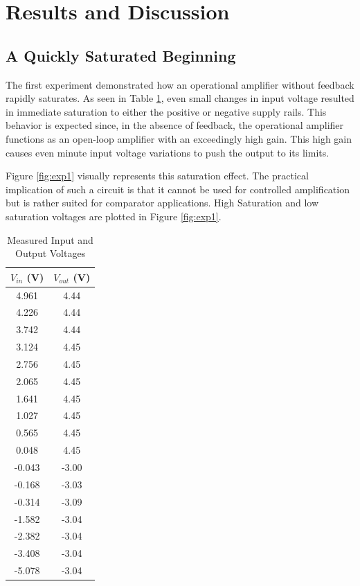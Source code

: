 \documentclass[12pt]{article}
\begin{document}
\section{Results and Discussion}
\subsection{A Quickly Saturated Beginning}

The first experiment demonstrated how an operational amplifier without feedback rapidly saturates. As seen in Table \ref{tab:measured_data}, even small changes in input voltage resulted in immediate saturation to either the positive or negative supply rails. This behavior is expected since, in the absence of feedback, the operational amplifier functions as an open-loop amplifier with an exceedingly high gain. This high gain causes even minute input voltage variations to push the output to its limits.

Figure \ref{fig:exp1} visually represents this saturation effect. The practical
implication of such a circuit is that it cannot be used for controlled
amplification but is rather suited for comparator applications. High Saturation
and low saturation voltages are plotted in Figure \ref{fig:exp1}.
\begin{table}[H]
	\centering
	\begin{tabular}{|c|c|}
		\hline
		$V_{in}$ (V) & $V_{out}$ (V) \\
		\hline
		4.961        & 4.44          \\
		4.226        & 4.44          \\
		3.742        & 4.44          \\
		3.124        & 4.45          \\
		2.756        & 4.45          \\
		2.065        & 4.45          \\
		1.641        & 4.45          \\
		1.027        & 4.45          \\
		0.565        & 4.45          \\
		0.048        & 4.45          \\
		-0.043       & -3.00         \\
		-0.168       & -3.03         \\
		-0.314       & -3.09         \\
		-1.582       & -3.04         \\
		-2.382       & -3.04         \\
		-3.408       & -3.04         \\
		-5.078       & -3.04         \\
		\hline
	\end{tabular}
	\caption{Measured Input and Output Voltages}
	\label{tab:measured_data}
\end{table}
\end{document}
